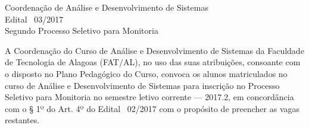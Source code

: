 \documentclass[10pt, oneside]{memoir}
\begin{document}
	

\setsecheadstyle{\raggedright\scshape}
\setbeforesecskip{-\onelineskip}
\setaftersecskip{\onelineskip}

\begin{center}
	Coordenação de Análise e Desenvolvimento de Sistemas\\
	Edital \textnumero~03/2017\\
	Segundo Processo Seletivo para Monitoria
\end{center}


A Coordenação do Curso de Análise e Desenvolvimento de Sistemas da Faculdade de Tecnologia de Alagoas (FAT/AL), no uso das suas atribuições, consoante com o disposto no Plano Pedagógico do Curso, convoca os alunos matriculados no curso de Análise e Desenvolvimento de Sistemas para inscrição no Processo Seletivo para Monitoria no semestre letivo corrente --- 2017.2, em concordância com o § 1º do Art. 4º do Edital \textnumero~02/2017 com o propósito de preencher as vagas restantes.
\end{document}

